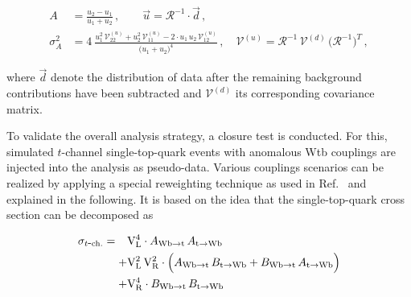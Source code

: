 \begin{align}
A&=\frac{u_2-u_1}{u_1+u_2}\,,\qquad \vec{u}=\mathcal{R}^{-1}\cdot\vec{d}\,,\\
\sigma^2_{A}&=4~\frac{u_1^2\,\mathcal{V}^{(u)}_{22}+u_2^2\,\mathcal{V}^{(u)}_{11}-2 \cdot u_1\,u_{2}\,\mathcal{V}^{(u)}_{12}}{\big(u_1+u_2\big)^4}\,, \quad\mathcal{V}^{(u)}=\mathcal{R}^{-1}\,\mathcal{V}^{(d)}\,\big(\mathcal{R}^{-1}\big)^{T}\,,
\end{align}

where $\vec{d}$ denote the distribution of data after the remaining background contributions have been subtracted and $\mathcal{V}^{(d)}$ its corresponding covariance matrix.

To validate the overall analysis strategy, a closure test is conducted. For this, simulated $t$-channel single-top-quark events with anomalous Wtb couplings are injected into the analysis as pseudo-data. Various couplings scenarios can be realized by applying a special reweighting technique as used in Ref.~\cite{Khachatryan:2016sib} and explained in the following. It is based on the idea that the single-top-quark cross section can be decomposed as

\begin{subequations}
\begin{align}
\sigma_{t\mathrm{\mbox{-}ch.}}=\hphantom{+}&\mathrm{V}_\mathrm{L}^4\cdot A_{\mathrm{Wb}\to\mathrm{t}}\,A_{\mathrm{t}\to\mathrm{Wb}}\label{eq:polarization-wtb-rew-vl}\\+&\mathrm{V}_\mathrm{L}^2\,\mathrm{V}_\mathrm{R}^2\cdot \Big(A_{\mathrm{Wb}\to\mathrm{t}}\,B_{\mathrm{t}\to\mathrm{Wb}}+B_{\mathrm{Wb}\to\mathrm{t}}\,A_{\mathrm{t}\to\mathrm{Wb}}\Big)\label{eq:polarization-wtb-rew-vlvr}\\+&\mathrm{V}_\mathrm{R}^4\cdot B_{\mathrm{Wb}\to\mathrm{t}}\,B_{\mathrm{t}\to\mathrm{Wb}}\label{eq:polarization-wtb-rew-vr}
\end{align}
\end{subequations}

